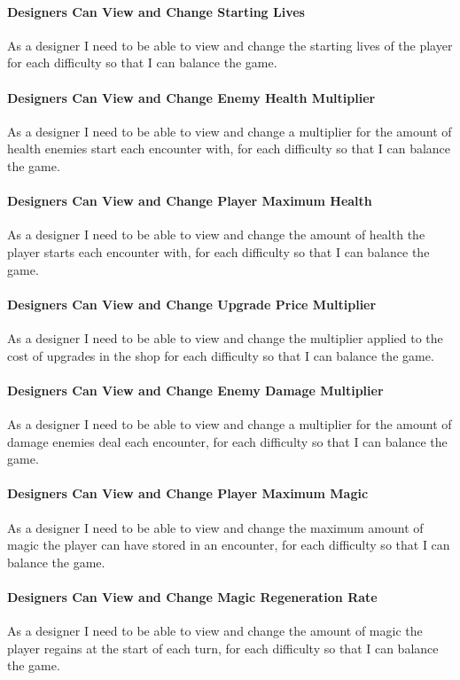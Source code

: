 \paragraph{Designers Can View and Change Starting Lives}
As a designer I need to be able to view and change the starting lives of the player for each difficulty so that I can balance the game.

\paragraph{Designers Can View and Change Enemy Health Multiplier}
As a designer I need to be able to view and change a multiplier for the amount of health enemies start each encounter with, for each difficulty so that I can balance the game.

\paragraph{Designers Can View and Change Player Maximum Health}
As a designer I need to be able to view and change the amount of health the player starts each encounter with, for each difficulty so that I can balance the game.

\paragraph{Designers Can View and Change Upgrade Price Multiplier}
As a designer I need to be able to view and change the multiplier applied to the cost of upgrades in the shop for each difficulty so that I can balance the game.

\paragraph{Designers Can View and Change Enemy Damage Multiplier}
As a designer I need to be able to view and change a multiplier for the amount of damage enemies deal each encounter, for each difficulty so that I can balance the game.

\paragraph{Designers Can View and Change Player Maximum Magic}
As a designer I need to be able to view and change the maximum amount of magic the player can have stored in an encounter, for each difficulty so that I can balance the game.

\paragraph{Designers Can View and Change Magic Regeneration Rate}
As a designer I need to be able to view and change the amount of magic the player regains at the start of each turn, for each difficulty so that I can balance the game.

